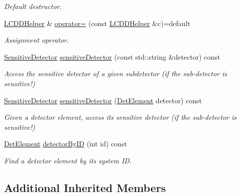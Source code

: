 \begin{DoxyCompactItemize}
\begin{DoxyCompactList}\small\item\em Default destructor. \end{DoxyCompactList}\item 
\hyperlink{class_d_d4hep_1_1_geometry_1_1_l_c_d_d_helper}{L\+C\+D\+D\+Helper} \& \hyperlink{class_d_d4hep_1_1_geometry_1_1_l_c_d_d_helper_a11c6c0b50f39dd07e11313b2e4ea912f}{operator=} (const \hyperlink{class_d_d4hep_1_1_geometry_1_1_l_c_d_d_helper}{L\+C\+D\+D\+Helper} \&c)=default
\begin{DoxyCompactList}\small\item\em Assignment operator. \end{DoxyCompactList}\item 
\hyperlink{class_d_d4hep_1_1_geometry_1_1_sensitive_detector}{Sensitive\+Detector} \hyperlink{class_d_d4hep_1_1_geometry_1_1_l_c_d_d_helper_a8033cf3d37363de1c014caf37a96a827}{sensitive\+Detector} (const std\+::string \&detector) const
\begin{DoxyCompactList}\small\item\em Access the sensitive detector of a given subdetector (if the sub-\/detector is sensitive!) \end{DoxyCompactList}\item 
\hyperlink{class_d_d4hep_1_1_geometry_1_1_sensitive_detector}{Sensitive\+Detector} \hyperlink{class_d_d4hep_1_1_geometry_1_1_l_c_d_d_helper_a84699961a1e06474706df5bdbd7c9335}{sensitive\+Detector} (\hyperlink{class_d_d4hep_1_1_geometry_1_1_det_element}{Det\+Element} detector) const
\begin{DoxyCompactList}\small\item\em Given a detector element, access it\textquotesingle{}s sensitive detector (if the sub-\/detector is sensitive!) \end{DoxyCompactList}\item 
\hyperlink{class_d_d4hep_1_1_geometry_1_1_det_element}{Det\+Element} \hyperlink{class_d_d4hep_1_1_geometry_1_1_l_c_d_d_helper_a52f8567fe82f2fef171fb6898cab5d8b}{detector\+By\+ID} (int id) const
\begin{DoxyCompactList}\small\item\em Find a detector element by it\textquotesingle{}s system ID. \end{DoxyCompactList}\end{DoxyCompactItemize}
\subsection*{Additional Inherited Members}


